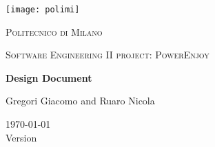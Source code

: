 \centering
\texttt{[image: polimi]}\\\vspace{0.25cm}
{\scshape\LARGE Politecnico di Milano\par}\vspace{0.25cm}
{\scshape\Large Software Engineering II project: PowerEnjoy\par}\vspace{1.5cm}
{\huge\bfseries Design Document\par}\vspace{1cm}
{\large Gregori Giacomo and Ruaro Nicola\par}\vfill

{\large \today \\Version \version}
